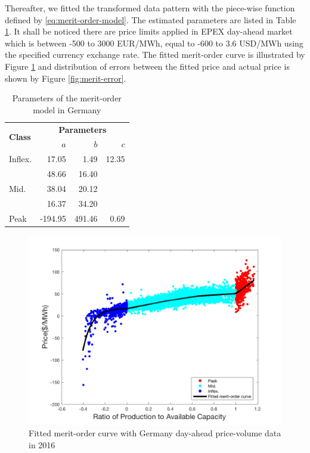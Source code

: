 Thereafter, we fitted the transformed data pattern with the piece-wise function defined by \eqref{eq:merit-order-model}. The estimated parameters are listed in Table \ref{tab:merit}. It shall be noticed there are price limits applied in EPEX day-ahead market\cite{EPEX_price_limit} which is between -500 to 3000 EUR/MWh, equal to -600 to 3.6 USD/MWh using the specified currency exchange rate. The fitted merit-order curve is illustrated by Figure \ref{fig:merit-fitted} and distribution of errors between the fitted price and actual price is shown by Figure \ref{fig:merit-error}.

\begin{table}[h!]
	\centering
	\begin{tabular}{l  r r r}
		\hline
		\multirow{2}{*}{\textbf{Class}} & \multicolumn{3}{c}{\textbf{Parameters}}\\
		& $a$ & $b$ & $c$\\
		\hline
		Inflex. & 17.05 & 1.49 & 12.35 \\
		\multirow{3}{*}{Mid.} & 48.66 & 16.40 & \\
		\multirow{3}{*}{} & 38.04 & 20.12 & \\
		\multirow{3}{*}{} & 16.37 & 34.20 & \\
		Peak & -194.95 & 491.46 & 0.69 \\
		\hline
	\end{tabular}
	\caption{Parameters of the merit-order model in Germany}\label{tab:merit}
\end{table}

\begin{figure}[h!]
	\centering
	\includegraphics[width=0.95\linewidth]{Figures/Merit-order-fitted}
	\caption{Fitted merit-order curve with Germany day-ahead price-volume data in 2016}
	\label{fig:merit-fitted}
\end{figure}

